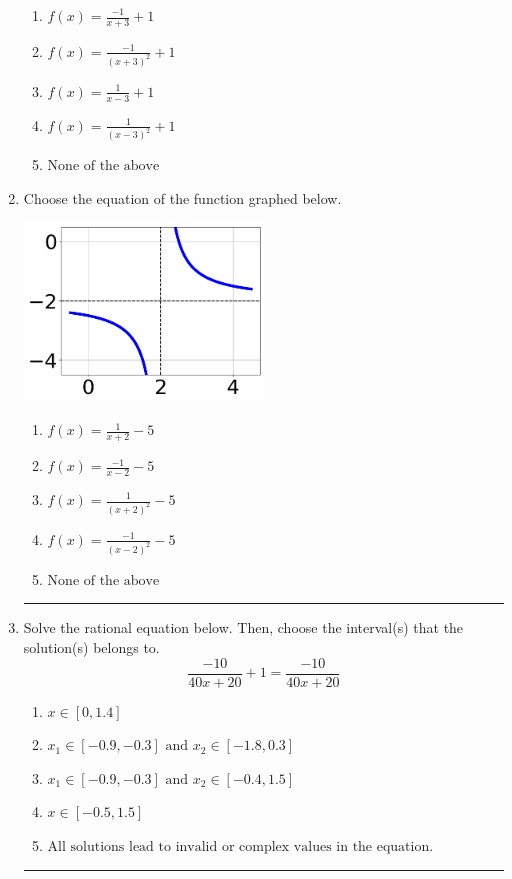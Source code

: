 \documentclass[14pt]{extbook}
\newcommand{\litem}[1]{\item#1\hspace*{-1cm}\rule{\textwidth}{0.4pt}}
\begin{document}
\begin{enumerate}
{\begin{center}
\end{center}
\begin{enumerate}[label=\Alph*.]
\item \( f(x) = \frac{-1}{x + 3} + 1 \)
\item \( f(x) = \frac{-1}{(x + 3)^2} + 1 \)
\item \( f(x) = \frac{1}{x - 3} + 1 \)
\item \( f(x) = \frac{1}{(x - 3)^2} + 1 \)
\item \( \text{None of the above} \)

\end{enumerate} }
\litem{
Choose the equation of the function graphed below.
\begin{center}
    \includegraphics[width=0.5\textwidth]{../Figures/rationalGraphToEquationCopyC.png}
\end{center}
\begin{enumerate}[label=\Alph*.]
\item \( f(x) = \frac{1}{x + 2} - 5 \)
\item \( f(x) = \frac{-1}{x - 2} - 5 \)
\item \( f(x) = \frac{1}{(x + 2)^2} - 5 \)
\item \( f(x) = \frac{-1}{(x - 2)^2} - 5 \)
\item \( \text{None of the above} \)

\end{enumerate} }
\litem{
Solve the rational equation below. Then, choose the interval(s) that the solution(s) belongs to.\[ \frac{-10}{40x + 20} + 1 = \frac{-10}{40x + 20} \]\begin{enumerate}[label=\Alph*.]
\item \( x \in [0,1.4] \)
\item \( x_1 \in [-0.9, -0.3] \text{ and } x_2 \in [-1.8,0.3] \)
\item \( x_1 \in [-0.9, -0.3] \text{ and } x_2 \in [-0.4,1.5] \)
\item \( x \in [-0.5,1.5] \)
\item \( \text{All solutions lead to invalid or complex values in the equation.} \)


\end{enumerate}}
\end{enumerate}
\end{document}
